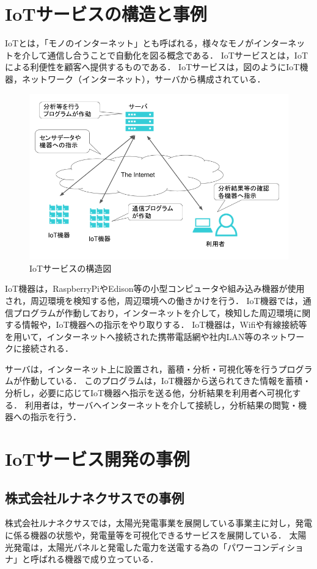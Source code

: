 \section{IoTサービスの構造と事例}
IoTとは，「モノのインターネット」とも呼ばれる，様々なモノがインターネットを介して通信し合うことで自動化を図る概念である．
IoTサービスとは，IoTによる利便性を顧客へ提供するものである．
IoTサービスは，図のようにIoT機器，ネットワーク（インターネット），サーバから構成されている．
\begin{figure}[htbp]
\includegraphics[width=16cm]{images/IoTstract.png}
\caption{IoTサービスの構造図}
\label{fig:iotstract}
\end{figure}

IoT機器は，RaspberryPiやEdison等の小型コンピュータや組み込み機器が使用され，周辺環境を検知する他，周辺環境への働きかけを行う．
IoT機器では，通信プログラムが作動しており，インターネットを介して，検知した周辺環境に関する情報や，IoT機器への指示をやり取りする．
IoT機器は，Wifiや有線接続等を用いて，インターネットへ接続された携帯電話網や社内LAN等のネットワークに接続される．
\medskip

サーバは，インターネット上に設置され，蓄積・分析・可視化等を行うプログラムが作動している．
このプログラムは，IoT機器から送られてきた情報を蓄積・分析し，必要に応じてIoT機器へ指示を送る他，分析結果を利用者へ可視化する．
利用者は，サーバへインターネットを介して接続し，分析結果の閲覧・機器への指示を行う．

\section{IoTサービス開発の事例}

\subsection{株式会社ルナネクサスでの事例}
株式会社ルナネクサスでは，太陽光発電事業を展開している事業主に対し，発電に係る機器の状態や，発電量等を可視化できるサービスを展開している．
太陽光発電は，太陽光パネルと発電した電力を送電する為の「パワーコンディショナ」と呼ばれる機器で成り立っている．
\medskip


